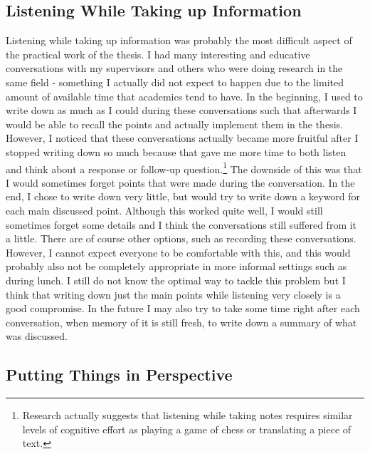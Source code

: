 \documentclass[]{article}
\begin{document}
\subsection{Listening While Taking up Information}
\label{section:listeninginfo}
Listening while taking up information was probably the most difficult aspect of the practical work of the thesis. I had many interesting and educative conversations with my supervisors and others who were doing research in the same field - something I actually did not expect to happen due to the limited amount of available time that academics tend to have. In the beginning, I used to write down as much as I could during these conversations such that afterwards I would be able to recall the points and actually implement them in the thesis. However, I noticed that these conversations actually became more fruitful after I stopped writing down so much because that gave me more time to both listen and think about a response or follow-up question.\footnote{Research actually suggests \cite{piolat2005cognitive} that listening while taking notes requires similar levels of cognitive effort as playing a game of chess or translating a piece of text.} The downside of this was that I would sometimes forget points that were made during the conversation. In the end, I chose to write down very little, but would try to write down a keyword for each main discussed point. Although this worked quite well, I would still sometimes forget some details and I think the conversations still suffered from it a little. There are of course other options, such as recording these conversations. However, I cannot expect everyone to be comfortable with this, and this would probably also not be completely appropriate in more informal settings such as during lunch. I still do not know the optimal way to tackle this problem but I think that writing down just the main points while listening very closely is a good compromise. In the future I may also try to take some time right after each conversation, when memory of it is still fresh, to write down a summary of what was discussed.

\subsection{Putting Things in Perspective}
\end{document}
